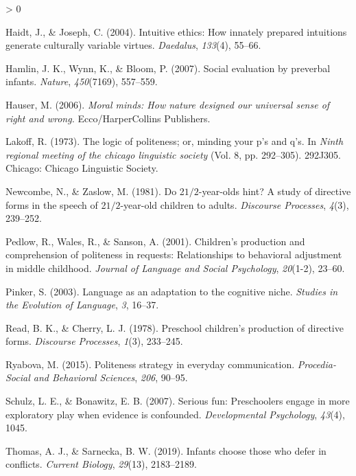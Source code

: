 \documentclass[
  english,
  man,floatsintext]{apa6}
\newlength{\cslhangindent}
\newenvironment{CSLReferences}[2] %
 {%
  \setlength{\parindent}{0pt}
  \ifodd #1 \everypar{\setlength{\hangindent}{\cslhangindent}}\ignorespaces\fi
  \ifnum #2 > 0
  \setlength{\parskip}{#2\baselineskip}
  \fi
 }%
 {}
\begin{document}
\begin{CSLReferences}{1}{0}
\leavevmode\hypertarget{ref-haidt2004}{}%
Haidt, J., \& Joseph, C. (2004). Intuitive ethics: How innately prepared intuitions generate culturally variable virtues. \emph{Daedalus}, \emph{133}(4), 55--66.

\leavevmode\hypertarget{ref-hamlin2007}{}%
Hamlin, J. K., Wynn, K., \& Bloom, P. (2007). Social evaluation by preverbal infants. \emph{Nature}, \emph{450}(7169), 557--559.

\leavevmode\hypertarget{ref-hauser2006}{}%
Hauser, M. (2006). \emph{Moral minds: How nature designed our universal sense of right and wrong.} Ecco/HarperCollins Publishers.

\leavevmode\hypertarget{ref-lakoff1973}{}%
Lakoff, R. (1973). The logic of politeness; or, minding your p's and q's. In \emph{Ninth regional meeting of the chicago linguistic society} (Vol. 8, pp. 292--305). 292J305. Chicago: Chicago Linguistic Society.

\leavevmode\hypertarget{ref-newcombe1981}{}%
Newcombe, N., \& Zaslow, M. (1981). Do 2\(1/2\)-year-olds hint? A study of directive forms in the speech of 2\(1/2\)-year-old children to adults. \emph{Discourse Processes}, \emph{4}(3), 239--252.

\leavevmode\hypertarget{ref-pedlow2001}{}%
Pedlow, R., Wales, R., \& Sanson, A. (2001). Children's production and comprehension of politeness in requests: Relationships to behavioral adjustment in middle childhood. \emph{Journal of Language and Social Psychology}, \emph{20}(1-2), 23--60.

\leavevmode\hypertarget{ref-pinker2003}{}%
Pinker, S. (2003). Language as an adaptation to the cognitive niche. \emph{Studies in the Evolution of Language}, \emph{3}, 16--37.

\leavevmode\hypertarget{ref-read1978}{}%
Read, B. K., \& Cherry, L. J. (1978). Preschool children's production of directive forms. \emph{Discourse Processes}, \emph{1}(3), 233--245.

\leavevmode\hypertarget{ref-ryabova2015}{}%
Ryabova, M. (2015). Politeness strategy in everyday communication. \emph{Procedia-Social and Behavioral Sciences}, \emph{206}, 90--95.

\leavevmode\hypertarget{ref-schulz2007}{}%
Schulz, L. E., \& Bonawitz, E. B. (2007). Serious fun: Preschoolers engage in more exploratory play when evidence is confounded. \emph{Developmental Psychology}, \emph{43}(4), 1045.

\leavevmode\hypertarget{ref-thomas2019}{}%
Thomas, A. J., \& Sarnecka, B. W. (2019). Infants choose those who defer in conflicts. \emph{Current Biology}, \emph{29}(13), 2183--2189.


\end{CSLReferences}
\end{document}
